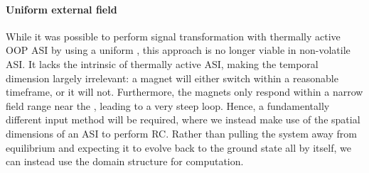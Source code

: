 \paragraph{Uniform external field}
While it was possible to perform signal transformation with thermally active OOP ASI by using a uniform , this approach is no longer viable in non-volatile ASI.
It lacks the intrinsic  of thermally active ASI, making the temporal dimension largely irrelevant: a magnet will either switch within a reasonable timeframe, or it will not.
Furthermore, the magnets only respond within a narrow field range near the , leading to a very steep  loop.
Hence, a fundamentally different input method will be required, where we instead make use of the spatial dimensions of an ASI to perform RC.
Rather than pulling the system away from equilibrium and expecting it to evolve back to the ground state all by itself, we can instead use the domain structure for computation.


